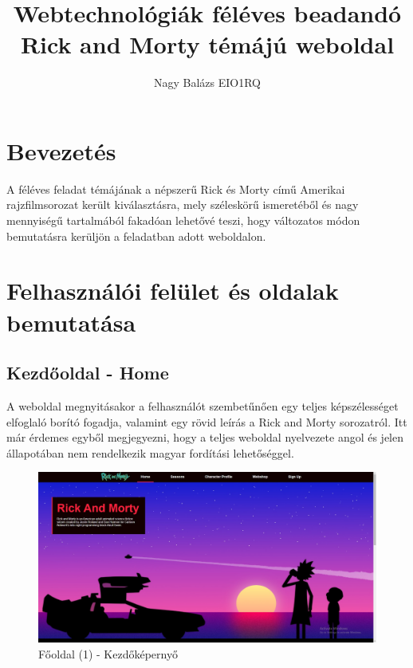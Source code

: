 \documentclass[12pt, titlepage]{article}
\begin{document}
\title{Webtechnológiák féléves beadandó\\Rick and Morty témájú weboldal}
\author{Nagy Balázs EIO1RQ}

\maketitle
\pagebreak

\tableofcontents
\pagebreak

\section*{Bevezetés}
A féléves feladat témájának a népszerű Rick és Morty című Amerikai rajzfilmsorozat került kiválasztásra, mely széleskörű ismeretéből és nagy mennyiségű tartalmából fakadóan lehetővé teszi, hogy változatos módon bemutatásra kerüljön a feladatban adott weboldalon.

\section{Felhasználói felület és oldalak bemutatása}
\subsection{Kezdőoldal - Home}
A weboldal megnyitásakor a felhasználót szembetűnően egy teljes képszélességet elfoglaló borító fogadja, valamint egy rövid leírás a Rick and Morty sorozatról. Itt már érdemes egyből megjegyezni, hogy a teljes weboldal nyelvezete angol és jelen állapotában nem rendelkezik magyar fordítási lehetőséggel.

\begin{figure}[!h]
	\centering
	\includegraphics[width=\linewidth]{images/home/1.jpg}
	\caption{Főoldal (1) - Kezdőképernyő}
\end{figure}
\end{document}
